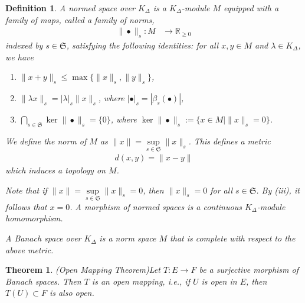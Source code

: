 \documentclass[12pts,a4paper]{amsart}
\newtheorem{definition}[proposition]{Definition}
\newtheorem{theorem}[proposition]{Theorem}
\begin{document}
\begin{definition}
	A \emph{normed space over $K_\Delta$} is a $K_\Delta$-module $M$ equipped with a family of maps, called a family of norms,
\begin{align*}
    \|\bullet\|_s: M &\to \mathbb{R}_{\geq 0}
\end{align*}
indexed by $s \in \mathfrak{S}$, satisfying the following identities: for all $x,y\in M$ and $\lambda\in K_\Delta$, we have
\begin{enumerate}
    \item[(i)] $\|x + y\|_s \leq \max\{\|x\|_s, \|y\|_s\}$,
    \item[(ii)] $\|\lambda x\|_s = |\lambda|_s \|x\|_s$, where $|\bullet|_s=|\beta_s(\bullet)|$,
    \item[(iii)] $\bigcap\limits_{s \in \mathfrak{S}} \ker \|\bullet\|_s = \{0\}$, where $\ker \|\bullet\|_s := \{x \in M \mid \|x\|_s = 0\}$.
\end{enumerate}
We define the \emph{norm} of $M$ as $\|x\| = \sup\limits_{s \in \mathfrak{S}} \|x\|_s$. This defines a metric
\begin{align*}
    d(x, y) = \|x - y\|
\end{align*}
which induces a topology on $M$.

Note that if $\|x\| = \sup\limits_{s \in \mathfrak{S}} \|x\|_s = 0$, then $\|x\|_s = 0$ for all $s \in \mathfrak{S}$. By (iii), it follows that $x = 0$. A \emph{morphism of normed spaces} is a continuous $K_\Delta$-module homomorphism.

A \emph{Banach space} over $K_\Delta$ is a norm space $M$ that is complete with respect to the above metric.
\end{definition}

\begin{theorem}{\emph{(Open Mapping Theorem)}}\label{Open Mapping Theorem}
	Let $T:E\to F$ be a surjective morphism of Banach spaces. Then $T$ is an open mapping, i.e., if $U$ is open in $E$, then $T(U)\subset F$ is also open.
\end{theorem}
\end{document}
